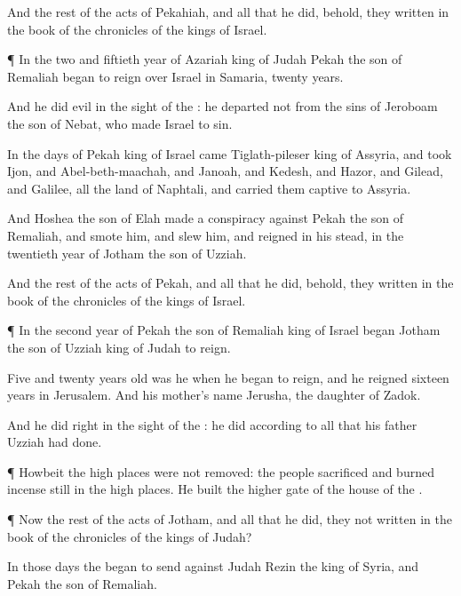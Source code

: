 {And the
rest of the
acts of
Pekahiah, and all that he
did, behold, they
{}
written in the
book of the
chronicles of the
kings of
Israel.


\par }{\PP {}¶ In the
two and
fiftieth
year of
Azariah
king of
Judah
Pekah the
son of
Remaliah began to
reign over
Israel in
Samaria,
{}
twenty
years.

And he
did
{}
evil in the
sight of the
{}: he
departed not from the
sins of
Jeroboam the
son of
Nebat, who made
Israel to
sin.

In the
days of
Pekah
king of
Israel
came
Tiglath-pileser
king of
Assyria, and
took
Ijon, and
Abel-beth-maachah, and
Janoah, and
Kedesh, and
Hazor, and
Gilead, and
Galilee, all the
land of
Naphtali, and carried them
captive to
Assyria.

And
Hoshea the
son of
Elah
made a
conspiracy against
Pekah the
son of
Remaliah, and
smote him, and
slew him, and
reigned in his stead, in the
twentieth
year of
Jotham the
son of
Uzziah.

And the
rest of the
acts of
Pekah, and all that he
did, behold, they
{}
written in the
book of the
chronicles of the
kings of
Israel.


\par }{\PP {}¶ In the
second
year of
Pekah the
son of
Remaliah
king of
Israel began
Jotham the
son of
Uzziah
king of
Judah to
reign.

Five and
twenty
years
old was he when he began to
reign, and he
reigned
sixteen
years in
Jerusalem. And his
mother’s
name
{}
Jerusha, the
daughter of
Zadok.

And he
did
{}
right in the
sight of the
{}: he
did according to all that his
father
Uzziah had
done.


\par }{\PP {}¶ Howbeit the high
places were not
removed: the
people
sacrificed and burned
incense still in the high
places. He
built the
higher
gate of the
house of the
{}.


\par }{\PP {}¶ Now the
rest of the
acts of
Jotham, and all that he
did,
{} they not
written in the
book of the
chronicles of the
kings of
Judah?

In those
days the
{}
began to
send against
Judah
Rezin the
king of
Syria, and
Pekah the
son of
Remaliah.

}
